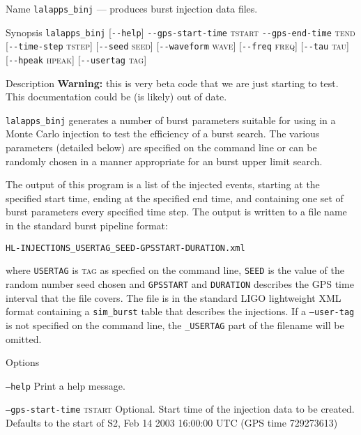 \begin{entry}
\item[Name]
\verb$lalapps_binj$ --- produces burst injection data files.

\item[Synopsis]
\verb$lalapps_binj$ 
[\verb$--help$]
\verb$--gps-start-time$ \textsc{tstart} 
\verb$--gps-end-time$ \textsc{tend} 
[\verb$--time-step$ \textsc{tstep}]
[\verb$--seed$ \textsc{seed}]
[\verb$--waveform$ \textsc{wave}]
[\verb$--freq$ \textsc{freq}]
[\verb$--tau$ \textsc{tau}]
[\verb$--hpeak$ \textsc{hpeak}]
[\verb$--usertag$ \textsc{tag}]

\item[Description] 
\textbf{Warning:}  this is very beta code that we are just starting to
test.   This documentation could be (is likely) out of date.

\verb$lalapps_binj$
generates a number of burst  parameters suitable  for using in a Monte
Carlo injection to test the efficiency of a burst search.  The  various
parameters (detailed  below)  are specified on the command line or can be
randomly chosen in a manner appropriate for an burst upper limit
search.

The output of this program  is  a  list  of  the  injected events,  starting
at  the specified start time, ending at the specified end time, and containing
one set  of burst parameters every specified time step.  The output
is written to a file name in the standard burst pipeline format:
\begin{center}
\begin{verbatim}
HL-INJECTIONS_USERTAG_SEED-GPSSTART-DURATION.xml
\end{verbatim}
\end{center}
where \verb$USERTAG$ is \textsc{tag} as specfied on the command line, 
\verb$SEED$ is the  value  of  the random number seed chosen and 
\verb$GPSSTART$ and \verb$DURATION$ describes the GPS time interval that
the file covers. The file is in the standard LIGO lightweight XML format
containing a \texttt{sim\_burst} table that describes the injections.
If a \texttt{--user-tag} is not specified on the command line, the
\texttt{\_USERTAG} part of the filename will be omitted.

\item[Options]\leavevmode
\begin{entry}
\item[\texttt{--help}] Print a help message.

\item[\texttt{--gps-start-time} \textsc{tstart}]
Optional.  Start time of the injection data to be created. Defaults to the
start of S2, Feb 14 2003 16:00:00 UTC (GPS time 729273613)


\end{entry}
\end{entry}
